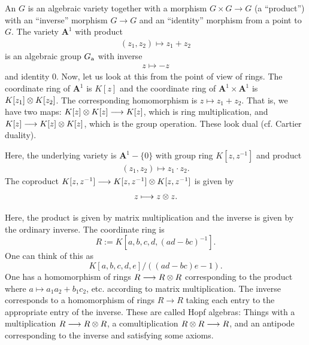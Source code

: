 \documentclass [11 pt, oneside] {article}
\begin{document}
\begin{example}\label{}
An  $G$ is an algebraic variety together with a morphism $G\times G\longrightarrow G$ (a ``product'') with an ``inverse'' morphism $G\longrightarrow G$ and an ``identity'' morphism from a point to $G$. The variety $\mathbf{A}^1$ with product
\begin{align*}
	(z_1,z_2)\longmapsto z_1+z_2
\end{align*}
is an algebraic group $G\textsubscript{a}$ with inverse
\begin{align*}
	z\longmapsto -z
\end{align*}
and identity $0$. Now, let us look at this from the point of view of rings. The coordinate ring of $\mathbf{A}^1$ is $K[z]$ and the coordinate ring of $\mathbf{A}^1\times \mathbf{A}^1$ is $K[z_1]\otimes K[z_2]$. The corresponding homomorphism is $z\longmapsto z_1+z_2$. That is, we have two maps: $K[z]\otimes K[z]\longrightarrow K[z]$, which is ring multiplication, and $K[z]\longrightarrow K[z]\otimes K[z]$, which is the group operation. These look dual (cf. Cartier duality).
\end{example}

\begin{example}\label{}
Here, the underlying variety is $\mathbf{A}^1 - \{0\}$ with group ring $K[z,z^{-1}]$ and product 
\begin{align*}
	(z_1,z_2)\longmapsto z_1\cdot z_2.
\end{align*}
The coproduct $K[z,z^{-1}] \longrightarrow K[z,z^{-1}]\otimes K[z,z^{-1}]$ is given by 
\begin{align*}
	z\longmapsto z\otimes z.
\end{align*}
\end{example}

\begin{example}[$\GL_2(K)$]\label{}
Here, the product is given by matrix multiplication and the inverse is given by the ordinary inverse. The coordinate ring is 
\[
	R:=K[a,b,c,d,(ad-bc) ^{-1}].
\] 
One can think of this as 
\[
	{K[a,b,c,d,e]}/{((ad-bc)e-1)}.
\] 
One has a homomorphism of rings $R\longrightarrow R\otimes R$ corresponding to the product where $a\longmapsto a_1a_2+b_1c_2$, etc. according to matrix multiplication. The inverse corresponds to a homomorphism of rings $R\longrightarrow R$ taking each entry to the appropriate entry of the inverse. These are called {Hopf algebras}: Things with a multiplication $R \longrightarrow  R\otimes R$, a comultiplication $R\otimes R\longrightarrow R$, and an antipode corresponding to the inverse and satisfying some axioms.
\end{example}
\end{document}
